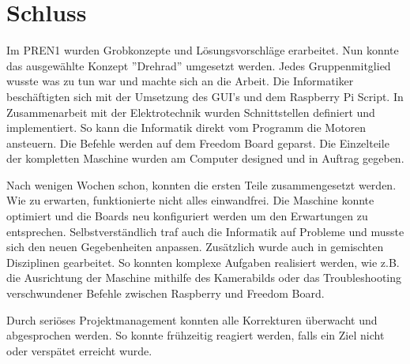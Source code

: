 \section{Schluss}

Im PREN1 wurden Grobkonzepte und Lösungsvorschläge erarbeitet. Nun konnte das ausgewählte Konzept ''Drehrad'' umgesetzt werden. Jedes Gruppenmitglied wusste was zu tun war und machte sich an die Arbeit.
Die Informatiker beschäftigten sich mit der Umsetzung des GUI's und dem Raspberry Pi Script.
In Zusammenarbeit mit der Elektrotechnik wurden Schnittstellen definiert und implementiert.
So kann die Informatik direkt vom Programm die Motoren ansteuern. Die Befehle werden auf dem Freedom Board geparst.
Die Einzelteile der kompletten Maschine wurden am Computer designed und in Auftrag gegeben.

Nach wenigen Wochen schon, konnten die ersten Teile zusammengesetzt werden. Wie zu erwarten, funktionierte nicht alles einwandfrei. Die Maschine konnte optimiert und die Boards neu konfiguriert werden um den Erwartungen zu entsprechen.
Selbstverständlich traf auch die Informatik auf Probleme und musste sich den neuen Gegebenheiten anpassen.
Zusätzlich wurde auch in gemischten Disziplinen gearbeitet. So konnten komplexe Aufgaben realisiert werden, wie z.B. die Ausrichtung der Maschine mithilfe des Kamerabilds oder das Troubleshooting verschwundener Befehle zwischen Raspberry und Freedom Board.

Durch seriöses Projektmanagement konnten alle Korrekturen überwacht und abgesprochen werden.
So konnte frühzeitig reagiert werden, falls ein Ziel nicht oder verspätet erreicht wurde.
